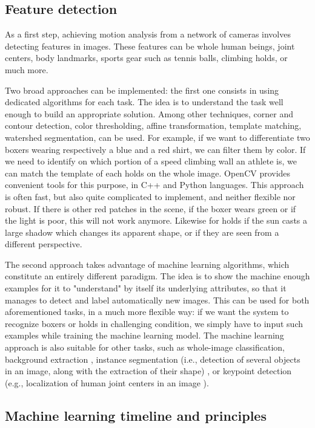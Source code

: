 \subsection{Feature detection}

As a first step, achieving motion analysis from a network of cameras involves detecting features in images. These features can be whole human beings, joint centers, body landmarks, sports gear such as tennis balls, climbing holds, or much more. 

Two broad approaches can be implemented: the first one consists in using dedicated algorithms for each task. The idea is to understand the task well enough to build an appropriate solution. Among other techniques, corner and contour detection, color thresholding, affine transformation, template matching, watershed segmentation, can be used. For example, if we want to differentiate two boxers wearing respectively a blue and a red shirt, we can filter them by color. If we need to identify on which portion of a speed climbing wall an athlete is, we can match the template of each holds on the whole image. OpenCV \cite{Bradski2000} provides convenient tools for this purpose, in C++ and Python languages. This approach is often fast, but also quite complicated to implement, and neither flexible nor robust. If there is other red patches in the scene, if the boxer wears green or if the light is poor, this will not work anymore. Likewise for holds if the sun casts a large shadow which changes its apparent shape, or if they are seen from a different perspective.

The second approach takes advantage of machine learning algorithms, which constitute an entirely different paradigm. The idea is to show the machine enough examples for it to "understand" by itself its underlying attributes, so that it manages to detect and label automatically new images. This can be used for both aforementioned tasks, in a much more flexible way: if we want the system to recognize boxers or holds in challenging condition, we simply have to input such examples while training the machine learning model. The machine learning approach is also suitable for other tasks, such as whole-image classification, background extraction \cite{Bouwmans2019}, instance segmentation (i.e., detection of several objects in an image, along with the extraction of their shape) \cite{Minaee2021}, or keypoint detection (e.g., localization of human joint centers in an image \cite{Chen2020}). 


\subsection{Machine learning timeline and principles}

